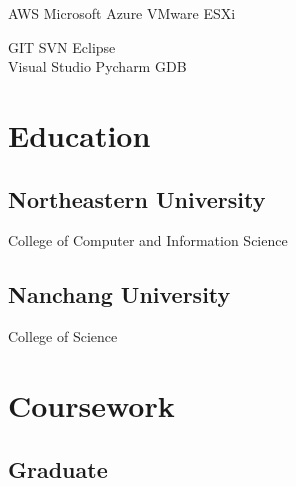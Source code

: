 \documentclass[a4paper]{lyu-resume} %
\begin{document}
\begin{minipage}[t]{0.33\textwidth}
\vspace{2 mm}

AWS \textbullet{} Microsoft Azure \textbullet{} VMware ESXi \\

\vspace{2 mm}

GIT \textbullet{} SVN \textbullet{} Eclipse \\
Visual Studio \textbullet{} Pycharm \textbullet{} GDB \\
\sectionspace %



\section{Education} 

\subsection{Northeastern University}

College of Computer and Information Science

\sectionspace %


\subsection{Nanchang University}

College of Science

\sectionspace %


\section{Coursework}

\subsection{Graduate}


\end{minipage}
\end{document}
